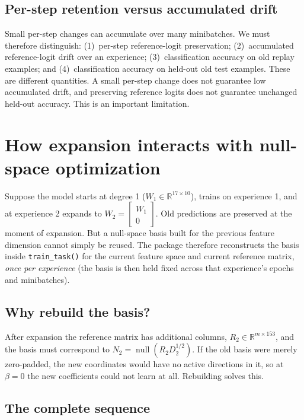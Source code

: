 \documentclass[11pt,a4paper]{article}
\newcommand{\R}{\mathbb{R}}
\DeclareMathOperator{\Null}{null}
\newcommand{\code}[1]{\texttt{#1}}
\begin{document}
\subsection{Per-step retention versus accumulated drift}

Small per-step changes can accumulate over many minibatches. We must therefore distinguish: (1)~per-step reference-logit preservation; (2)~accumulated reference-logit drift over an experience; (3)~classification accuracy on old replay examples; and (4)~classification accuracy on held-out old test examples. These are different quantities. A small per-step change does not guarantee low accumulated drift, and preserving reference logits does not guarantee unchanged held-out accuracy. This is an important limitation.

\section{How expansion interacts with null-space optimization}

Suppose the model starts at degree 1 ($W_1\in\R^{17\times10}$), trains on experience 1, and at experience 2 expands to $W_2=\begin{bmatrix}W_1\\0\end{bmatrix}$. Old predictions are preserved at the moment of expansion. But a null-space basis built for the previous feature dimension cannot simply be reused. The package therefore reconstructs the basis inside \code{train\_task()} for the current feature space and current reference matrix, \emph{once per experience} (the basis is then held fixed across that experience's epochs and minibatches).

\subsection{Why rebuild the basis?}

After expansion the reference matrix has additional columns, $R_2\in\R^{m\times153}$, and the basis must correspond to $N_2=\Null(R_2D_2^{1/2})$. If the old basis were merely zero-padded, the new coordinates would have no active directions in it, so at $\beta=0$ the new coefficients could not learn at all. Rebuilding solves this.

\subsection{The complete sequence}
\end{document}
